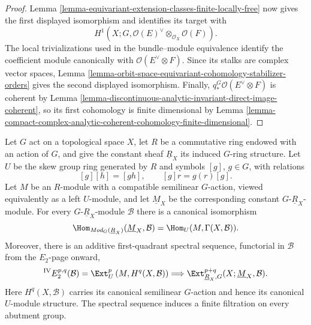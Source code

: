 \begin{proof}
Lemma \ref{lemma-equivariant-extension-classes-finite-locally-free} now gives
the first displayed isomorphism and identifies its target with
$$
H^1\left(X;G,
\mathcal O(E)^\vee\otimes_{\mathcal O_X}\mathcal O(F)\right).
$$
The local trivializations used in the bundle--module equivalence identify the
coefficient module canonically with $\mathcal O(E^\vee\otimes F)$. Since its
stalks are complex vector spaces, Lemma
\ref{lemma-orbit-space-equivariant-cohomology-stabilizer-orders} gives the
second displayed isomorphism. Finally,
$q_*^G\mathcal O(E^\vee\otimes F)$ is coherent by Lemma
\ref{lemma-discontinuous-analytic-invariant-direct-image-coherent}, so its
first cohomology is finite dimensional by Lemma
\ref{lemma-compact-complex-analytic-coherent-cohomology-finite-dimensional}.
\end{proof}


\begin{lemma}
\label{lemma-equivariant-ext-crossed-product-spectral-sequence}
\begin{reference}
\cite[Chapter V, \S 5.6, spectral sequence IV, p. 218]{Tohoku}
\end{reference}
Let $G$ act on a topological space $X$, let $R$ be a commutative ring
endowed with an action of $G$, and give the constant sheaf
$\underline R_X$ its induced $G$-ring structure. Let $U$ be the skew group
ring generated by $R$ and symbols $[g]$, $g\in G$, with
relations
$$
[g][h]=[gh],
\qquad
[g]r=g(r)[g].
$$
Let $M$ be an $R$-module with a compatible semilinear $G$-action, viewed
equivalently as a left $U$-module, and let $\underline M_X$ be the
corresponding constant $G$-$\underline R_X$-module. For every
$G$-$\underline R_X$-module $\mathcal B$ there is a canonical isomorphism
$$
\Hom_{\textit{Mod}_G(\underline R_X)}
(\underline M_X,\mathcal B)
=
\Hom_U(M,\Gamma(X,\mathcal B)).
$$
Moreover, there is an additive first-quadrant spectral sequence, functorial
in $\mathcal B$ from the $E_2$-page onward,
$$
{}^{\mathrm{IV}}E_2^{p,q}(\mathcal B)
=
\Ext_U^p\left(M,H^q(X,\mathcal B)\right)
\Longrightarrow
\Ext_{\underline R_X,G}^{p+q}
(X;\underline M_X,\mathcal B).
$$
Here $H^q(X,\mathcal B)$ carries its canonical semilinear $G$-action and
hence its canonical $U$-module structure. The spectral sequence induces a
finite filtration on every abutment group.
\end{lemma}

